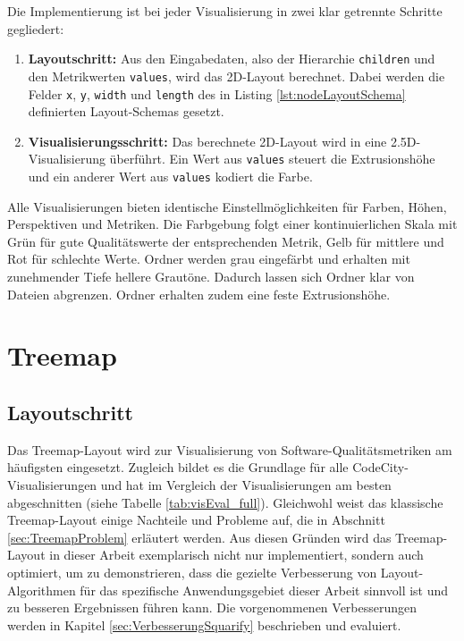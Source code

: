 Die Implementierung ist bei jeder Visualisierung in zwei klar getrennte Schritte gegliedert:
\begin{enumerate}
    \item \textbf{Layoutschritt:} Aus den Eingabedaten, also der Hierarchie \texttt{children} und den Metrikwerten \texttt{values}, wird das 2D-Layout berechnet. Dabei werden die Felder \texttt{x}, \texttt{y}, \texttt{width} und \texttt{length} des in Listing \ref{lst:nodeLayoutSchema} definierten Layout-Schemas gesetzt.
    \item \textbf{Visualisierungsschritt:} Das berechnete 2D-Layout wird in eine 2{.}5D-Visualisierung überführt. Ein Wert aus \texttt{values} steuert die Extrusionshöhe und ein anderer Wert aus \texttt{values} kodiert die Farbe.
\end{enumerate}

Alle Visualisierungen bieten identische Einstellmöglichkeiten für Farben, Höhen, Perspektiven und Metriken. Die Farbgebung folgt einer kontinuierlichen Skala mit Grün für gute Qualitätswerte der entsprechenden Metrik, Gelb für mittlere und Rot für schlechte Werte. Ordner werden grau eingefärbt und erhalten mit zunehmender Tiefe hellere Grautöne. Dadurch lassen sich Ordner klar von Dateien abgrenzen. Ordner erhalten zudem eine feste Extrusionshöhe.

\section{Treemap} \label{sec:TreemapImplementierung}

\subsection*{Layoutschritt}
Das Treemap-Layout wird zur Visualisierung von Software-Qualitätsmetriken am häufigsten eingesetzt. Zugleich bildet es die Grundlage für alle CodeCity-Visualisierungen und hat im Vergleich der Visualisierungen am besten abgeschnitten (siehe Tabelle \ref{tab:visEval_full}). Gleichwohl weist das klassische Treemap-Layout einige Nachteile und Probleme auf, die in Abschnitt \ref{sec:TreemapProblem} erläutert werden. Aus diesen Gründen wird das Treemap-Layout in dieser Arbeit exemplarisch nicht nur implementiert, sondern auch optimiert, um zu demonstrieren, dass die gezielte Verbesserung von Layout-Algorithmen für das spezifische Anwendungsgebiet dieser Arbeit sinnvoll ist und zu besseren Ergebnissen führen kann. Die vorgenommenen Verbesserungen werden in Kapitel \ref{sec:VerbesserungSquarify} beschrieben und evaluiert.

